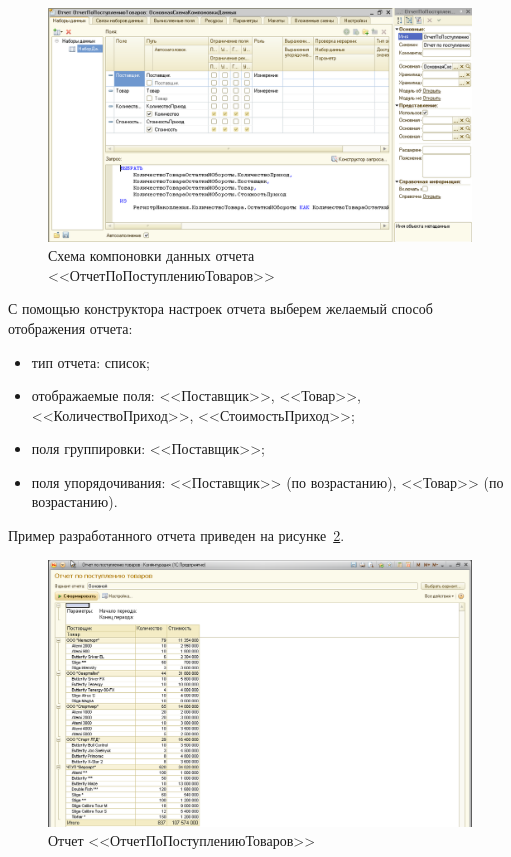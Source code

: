 \begin{figure}[h!]
  \centering
  \includegraphics[width=150mm]{pic/report_input_scheme}
  \caption{Схема компоновки данных отчета \\ <<ОтчетПоПоступлениюТоваров>>}
  \label{fig:report_input_scheme}
\end{figure}

\pagebreak

С помощью конструктора настроек отчета выберем желаемый способ отображения
отчета:
\begin{itemize}
\item тип отчета: список;
\item отображаемые поля: <<Поставщик>>, <<Товар>>,
  <<КоличествоПриход>>, <<СтоимостьПриход>>;
\item поля группировки: <<Поставщик>>;
\item поля упорядочивания:
  <<Поставщик>> (по возрастанию),
  <<Товар>> (по возрастанию).
\end{itemize}

Пример разработанного отчета приведен на рисунке~\ref{fig:report_input}.

\begin{figure}[h!]
  \centering
  \includegraphics[width=150mm]{pic/report_input}
  \caption{Отчет <<ОтчетПоПоступлениюТоваров>>}
  \label{fig:report_input}
\end{figure}


